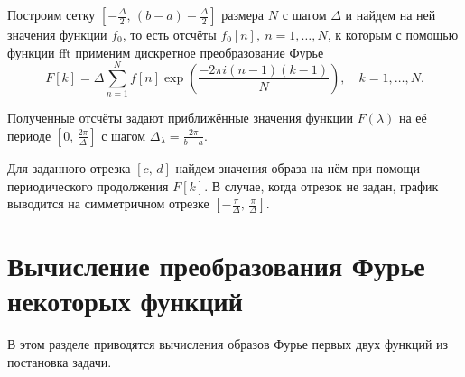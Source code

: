 \documentclass[11pt]{article}
\begin{document}
Построим сетку $\left[-\frac{\Delta}{2},\, \left(b - a\right) 
-\frac{\Delta}{2}\right]$ размера $N$ с шагом $\Delta$ и найдем на ней значения функции $f_0$, 
то есть отсчёты  $f_0\left[n\right], \ n = 1, \ldots, N$,
к которым с помощью функции fft применим дискретное преобразование Фурье
$$ F\left[k\right] = \Delta\sum_{n=1}^{N} f\left[n\right]\exp
\left({\frac{-2\pi i \left(n-1\right)\left(k-1\right)}{N}}\right), \quad k = 1, \ldots, N. $$

Полученные отсчёты задают приближённые значения функции $F\left(\lambda\right)$ на её периоде
$\left[0,\, \frac{2\pi}{\Delta}\right]$ с шагом $\Delta_\lambda = \frac{2\pi}{b-a}$. 

Для заданного отрезка $\left[c,\, d\right]$ найдем значения образа на нём при помощи периодического 
продолжения $F\left[k\right]$. В случае, когда отрезок не задан, график выводится на симметричном 
отрезке $\left[-\frac{\pi}{\Delta},\, \frac{\pi}{\Delta}\right]$.

\newpage
\section{Вычисление преобразования Фурье некоторых функций}

В этом разделе приводятся вычисления образов Фурье первых двух функций из постановка задачи.
\end{document}
